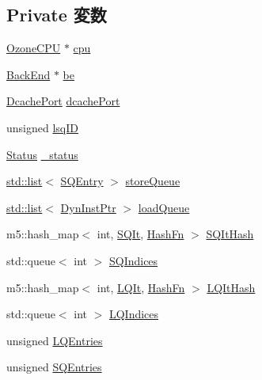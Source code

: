 \subsection*{Private 変数}
\begin{DoxyCompactItemize}
\item 
\hyperlink{classOzoneCPU}{OzoneCPU} $\ast$ \hyperlink{classOzoneLWLSQ_a61b5f503eec141308b0cd6b4322b405b}{cpu}
\item 
\hyperlink{classBackEnd}{BackEnd} $\ast$ \hyperlink{classOzoneLWLSQ_a84f815aa1fa864ba2e6d75f5ad2b52d1}{be}
\item 
\hyperlink{classOzoneLWLSQ_1_1DcachePort}{DcachePort} \hyperlink{classOzoneLWLSQ_a38b03978ad7720fdc910ff6a8b44585f}{dcachePort}
\item 
unsigned \hyperlink{classOzoneLWLSQ_adfd96fbbaa327a31d20f0d4134418fad}{lsqID}
\item 
\hyperlink{classOzoneLWLSQ_a67a0db04d321a74b7e7fcfd3f1a3f70b}{Status} \hyperlink{classOzoneLWLSQ_a6cdf6e6db875a442f3ab6db542bd2bb5}{\_\-status}
\item 
\hyperlink{classstd_1_1list}{std::list}$<$ \hyperlink{structOzoneLWLSQ_1_1SQEntry}{SQEntry} $>$ \hyperlink{classOzoneLWLSQ_aadda2adf789b0c8a3eb952ac5d65d4ed}{storeQueue}
\item 
\hyperlink{classstd_1_1list}{std::list}$<$ \hyperlink{classOzoneLWLSQ_a028ce10889c5f6450239d9e9a7347976}{DynInstPtr} $>$ \hyperlink{classOzoneLWLSQ_a6800290ffd43f3207c629be7f2d6228f}{loadQueue}
\item 
m5::hash\_\-map$<$ int, \hyperlink{classOzoneLWLSQ_a3b2dd16f487adc977c43201cd7f51558}{SQIt}, \hyperlink{structOzoneLWLSQ_1_1HashFn}{HashFn} $>$ \hyperlink{classOzoneLWLSQ_a3eb9bc9d55fde5b98e8d28a220d247f6}{SQItHash}
\item 
std::queue$<$ int $>$ \hyperlink{classOzoneLWLSQ_a94838aca72c880423d2328ae17f065e6}{SQIndices}
\item 
m5::hash\_\-map$<$ int, \hyperlink{classOzoneLWLSQ_a363c8c15e054d23b34f72063429933b8}{LQIt}, \hyperlink{structOzoneLWLSQ_1_1HashFn}{HashFn} $>$ \hyperlink{classOzoneLWLSQ_afd55cfcf685cda7dafc7c52d5105e129}{LQItHash}
\item 
std::queue$<$ int $>$ \hyperlink{classOzoneLWLSQ_a78218da891879fae16fe75c73981f75f}{LQIndices}
\item 
unsigned \hyperlink{classOzoneLWLSQ_aafa99d800d574095881acbacdbbbcc47}{LQEntries}
\item 
unsigned \hyperlink{classOzoneLWLSQ_a38c8af5392da70119dc5cce4e3637cbc}{SQEntries}
\item 

\end{DoxyCompactItemize}
